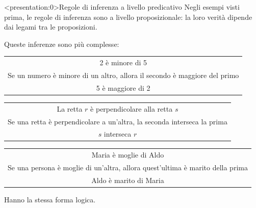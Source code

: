 \documentclass[aspectratio=169,10pt]{beamer}
\newenvironment{inference}{\begin{tabular}{c}}{\end{tabular}}
\begin{document}



\begin{frame}<presentation:0>{Regole di inferenza a livello predicativo}
	Negli esempi visti prima, le regole di inferenza sono a livello \alert{proposizionale}: la loro verità dipende dai legami tra le proposizioni.

    \medskip
    Queste inferenze sono più complesse:
	\begin{center}
		\begin{inference}
			2 è minore di 5\\
			Se un numero è minore di un altro, allora il secondo è maggiore del primo\\
			\hline
			5 è maggiore di 2
		\end{inference}

		\medskip\medskip
		\begin{inference}
		La retta $r$ è perpendicolare alla retta $s$\\
		Se una retta è perpendicolare a un'altra, la seconda interseca la prima\\
		\hline
		$s$ interseca $r$
		\end{inference}

		\medskip\medskip
		\begin{inference}
		Maria è moglie di Aldo\\
		Se una persona è moglie di un'altra, allora quest'ultima è marito della prima\\
		\hline
		Aldo è marito di Maria
		\end{inference}
	\end{center}
	Hanno la stessa \alert{forma logica}.
\end{frame}
\end{document}
